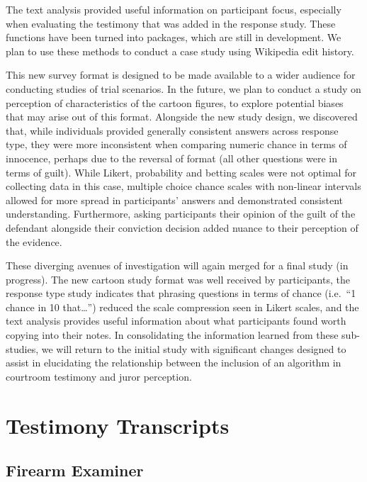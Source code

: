 \documentclass[print]{nuthesis}
\begin{document}
The text analysis provided useful information on participant focus, especially when evaluating the testimony that was added in the response study.
These functions have been turned into packages, which are still in development.
We plan to use these methods to conduct a case study using Wikipedia edit history.

This new survey format is designed to be made available to a wider audience for conducting studies of trial scenarios.
In the future, we plan to conduct a study on perception of characteristics of the cartoon figures, to explore potential biases that may arise out of this format.
Alongside the new study design, we discovered that, while individuals provided generally consistent answers across response type, they were more inconsistent when comparing numeric chance in terms of innocence, perhaps due to the reversal of format (all other questions were in terms of guilt).
While Likert, probability and betting scales were not optimal for collecting data in this case, multiple choice chance scales with non-linear intervals allowed for more spread in participants' answers and demonstrated consistent understanding.
Furthermore, asking participants their opinion of the guilt of the defendant alongside their conviction decision added nuance to their perception of the evidence.

These diverging avenues of investigation will again merged for a final study (in progress).
The new cartoon study format was well received by participants, the response type study indicates that phrasing questions in terms of chance (i.e.~``1 chance in 10 that\ldots{}'') reduced the scale compression seen in Likert scales, and the text analysis provides useful information about what participants found worth copying into their notes.
In consolidating the information learned from these sub-studies, we will return to the initial study with significant changes designed to assist in elucidating the relationship between the inclusion of an algorithm in courtroom testimony and juror perception.

\appendix

\hypertarget{testimony-transcripts}{%
\chapter{Testimony Transcripts}\label{testimony-transcripts}}

\hypertarget{firearm-examiner}{%
\section{Firearm Examiner}\label{firearm-examiner}}
\end{document}
